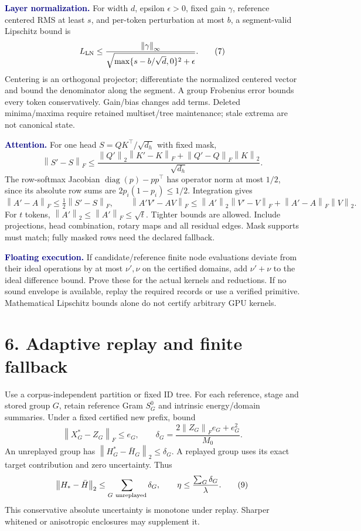 \documentclass[11pt]{article}
\newcommand{\norm}[1]{\left\|#1\right\|}\newcommand{\tr}{\operatorname{tr}}
\newcommand{\note}[1]{\textcolor{navy}{\textbf{#1}}}
\begin{document}
\note{Layer normalization.} For width $d$, epsilon $\epsilon>0$, fixed gain $\gamma$, reference centered RMS at least $s$, and per-token perturbation at most $b$, a segment-valid Lipschitz bound is
\[
 L_{\rm LN}\leq\frac{\norm\gamma_\infty}
 {\sqrt{\max\{s-b/\sqrt d,0\}^2+\epsilon}}. \tag{7}
\]
Centering is an orthogonal projector; differentiate the normalized centered vector and bound the denominator along the segment. A group Frobenius error bounds every token conservatively. Gain/bias changes add terms. Deleted minima/maxima require retained multiset/tree maintenance; stale extrema are not canonical state.

\note{Attention.} For one head $S=QK^{\top}/\sqrt{d_h}$ with fixed mask,
\[
 \norm{S'-S}_F\leq
 \frac{\norm{Q'}_2\norm{K'-K}_F+
 \norm{Q'-Q}_F\norm K_2}{\sqrt{d_h}}.
\]
The row-softmax Jacobian $\operatorname{diag}(p)-pp^{\top}$ has operator norm at most $1/2$, since its absolute row sums are $2p_i(1-p_i)\leq1/2$. Integration gives
\[
 \norm{A'-A}_F\leq\tfrac12\norm{S'-S}_F,\qquad
 \norm{A'V'-AV}_F\leq\norm{A'}_2\norm{V'-V}_F+
 \norm{A'-A}_F\norm V_2. \tag{8}
\]
For $t$ tokens, $\norm{A'}_2\leq\norm{A'}_F\leq\sqrt t$. Tighter bounds are allowed. Include projections, head combination, rotary maps and all residual edges. Mask supports must match; fully masked rows need the declared fallback.

\note{Floating execution.} If candidate/reference finite node evaluations deviate from their ideal operations by at most $\nu',\nu$ on the certified domains, add $\nu'+\nu$ to the ideal difference bound. Prove these for the actual kernels and reductions. If no sound envelope is available, replay the required records or use a verified primitive. Mathematical Lipschitz bounds alone do not certify arbitrary GPU kernels.

\newpage
\section*{6. Adaptive replay and finite fallback}
Use a corpus-independent partition or fixed ID tree. For each reference, stage and stored group $G$, retain reference Gram $S_G^0$ and intrinsic energy/domain summaries. Under a fixed certified new prefix, bound
\[
 \norm{X_G^*-Z_G}_F\leq e_G,\qquad
 \delta_G=\frac{2\norm{Z_G}_F e_G+e_G^2}{M_0}.
\]
An unreplayed group has $\norm{H_G^*-\bar H_G}_2\leq\delta_G$. A replayed group uses its exact target contribution and zero uncertainty. Thus
\[
 \norm{H_*-\bar H}_2\leq\sum_{G\ \rm unreplayed}\delta_G,
 \qquad \eta\leq\frac{\sum_G\delta_G}{\lambda}. \tag{9}
\]
This conservative absolute uncertainty is monotone under replay. Sharper whitened or anisotropic enclosures may supplement it.
\end{document}
